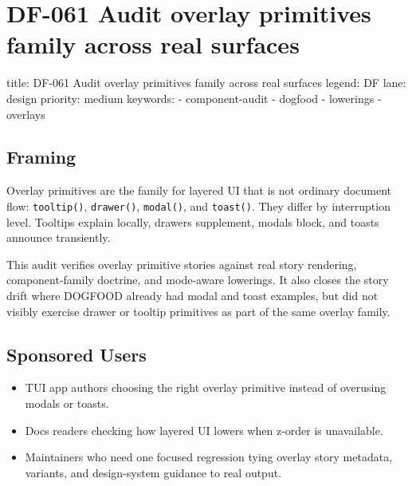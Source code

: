 \chapter{DF-061 Audit overlay primitives family across real surfaces}\label{record-102}

\smallskip

\begin{RecordMeta}
title: DF-061 Audit overlay primitives family across real surfaces
legend: DF
lane: design
priority: medium
keywords:
  - component-audit
  - dogfood
  - lowerings
  - overlays

\end{RecordMeta}

\section{Framing}\label{record-102-framing}

Overlay primitives are the family for layered UI that is not ordinary document flow: \texttt{t\allowbreak{}o\allowbreak{}o\allowbreak{}l\allowbreak{}t\allowbreak{}i\allowbreak{}p\allowbreak{}(\allowbreak{})}, \texttt{d\allowbreak{}r\allowbreak{}a\allowbreak{}w\allowbreak{}e\allowbreak{}r\allowbreak{}(\allowbreak{})}, \texttt{m\allowbreak{}o\allowbreak{}d\allowbreak{}a\allowbreak{}l\allowbreak{}(\allowbreak{})}, and \texttt{t\allowbreak{}o\allowbreak{}a\allowbreak{}s\allowbreak{}t\allowbreak{}(\allowbreak{})}. They differ by interruption level. Tooltips explain locally, drawers supplement, modals block, and toasts announce transiently.

This audit verifies overlay primitive stories against real story rendering, component-family doctrine, and mode-aware lowerings. It also closes the story drift where DOGFOOD already had modal and toast examples, but did not visibly exercise drawer or tooltip primitives as part of the same overlay family.

\section{Sponsored Users}\label{record-102-sponsored-users}

\begin{itemize}
\tightlist
\item
  TUI app authors choosing the right overlay primitive instead of overusing modals or toasts.
\item
  Docs readers checking how layered UI lowers when z-order is unavailable.
\item
  Maintainers who need one focused regression tying overlay story metadata, variants, and design-system guidance to real output.
\end{itemize}

